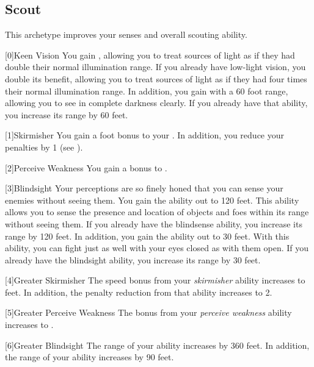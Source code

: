     \newpage
    \subsection{Scout}
        This archetype improves your senses and overall scouting ability.

        [0]{Keen Vision}
        You gain , allowing you to treat sources of light as if they had double their normal illumination range.
        If you already have low-light vision, you double its benefit, allowing you to treat sources of light as if they had four times their normal illumination range.
        In addition, you gain  with a 60 foot range, allowing you to see in complete darkness clearly.
        If you already have that ability, you increase its range by 60 feet.

        [1]{Skirmisher} You gain a  foot bonus to your .
        In addition, you reduce your  penalties by 1 (see ).

        [2]{Perceive Weakness} You gain a  bonus to .

        [3]{Blindsight} Your perceptions are so finely honed that you can sense your enemies without seeing them.
        You gain the  ability out to 120 feet.
        This ability allows you to sense the presence and location of objects and foes within its range without seeing them.
        If you already have the blindsense ability, you increase its range by 120 feet.
        In addition, you gain the  ability out to 30 feet.
        With this ability, you can fight just as well with your eyes closed as with them open.
        If you already have the blindsight ability, you increase its range by 30 feet.

        [4]{Greater Skirmisher} The speed bonus from your \textit{skirmisher} ability increases to  feet.
        In addition, the penalty reduction from that ability increases to 2.

        [5]{Greater Perceive Weakness} The bonus from your \textit{perceive weakness} ability increases to .

        [6]{Greater Blindsight} The range of your  ability increases by 360 feet.
        In addition, the range of your  ability increases by 90 feet.

